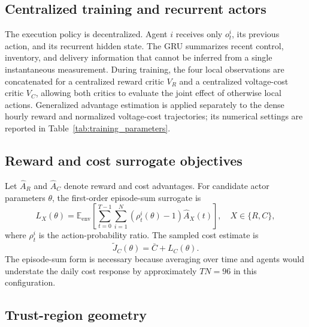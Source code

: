 \documentclass[final,5p,times]{elsarticle}
\begin{document}
\subsection{Centralized training and recurrent actors}

The execution policy is decentralized. Agent $i$ receives only $o_t^i$, its previous action, and its recurrent hidden state. The GRU summarizes recent control, inventory, and delivery information that cannot be inferred from a single instantaneous measurement. During training, the four local observations are concatenated for a centralized reward critic $V_R$ and a centralized voltage-cost critic $V_C$, allowing both critics to evaluate the joint effect of otherwise local actions. Generalized advantage estimation is applied separately to the dense hourly reward and normalized voltage-cost trajectories; its numerical settings are reported in Table~\ref{tab:training_parameters}.

\subsection{Reward and cost surrogate objectives}

Let $\hat A_R$ and $\hat A_C$ denote reward and cost advantages. For candidate actor parameters $\theta$, the first-order episode-sum surrogate is
\begin{equation}
 L_X(\theta)=\mathbb{E}_{\mathrm{env}}\left[
 \sum_{t=0}^{T-1}\sum_{i=1}^{N}
 \left(\rho_t^i(\theta)-1\right)\hat A_X(t)\right],
 \quad X\in\{R,C\},
\end{equation}
where $\rho_t^i$ is the action-probability ratio. The sampled cost estimate is
\begin{equation}
 \widetilde J_C(\theta)=\bar C+L_C(\theta).
\end{equation}
The episode-sum form is necessary because averaging over time and agents would understate the daily cost response by approximately $TN=96$ in this configuration.

\subsection{Trust-region geometry}
\end{document}
